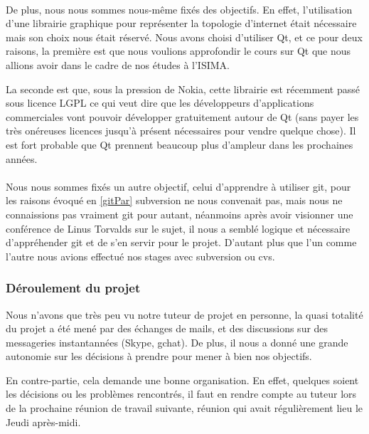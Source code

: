 \paragraph{} De plus, nous nous sommes nous-même fixés des objectifs. En effet, l'utilisation d'une librairie graphique pour représenter la topologie d'internet était nécessaire mais son choix nous était réservé. Nous avons choisi d'utiliser Qt, et ce pour deux raisons, la première est que nous voulions approfondir le cours sur Qt que nous allions avoir dans le cadre de nos études à l'ISIMA.

La seconde est que, sous la pression de Nokia, cette librairie est récemment passé sous licence LGPL ce qui veut dire que les développeurs d'applications commerciales vont pouvoir développer gratuitement autour de Qt (sans payer les très onéreuses licences jusqu'à présent nécessaires pour vendre quelque chose). Il est fort probable que Qt prennent beaucoup plus d'ampleur dans les prochaines années.

\paragraph{} Nous nous sommes fixés un autre objectif, celui d'apprendre à utiliser git, pour les raisons évoqué en \ref{gitPar} subversion ne nous convenait pas, mais nous ne connaissions pas vraiment git pour autant, néanmoins après avoir visionner une conférence de Linus Torvalds sur le sujet, il nous a semblé logique et nécessaire d'appréhender git et de s'en servir pour le projet. D'autant plus que l'un comme l'autre nous avions effectué nos stages avec subversion ou cvs.

\subsubsection{Déroulement du projet}

Nous n'avons que très peu vu notre tuteur de projet en personne, la quasi totalité du projet a été mené par des échanges de mails, et des discussions sur des messageries instantannées (Skype, gchat). De plus, il nous a donné une grande autonomie sur les décisions à prendre pour mener à bien nos objectifs.

En contre-partie, cela demande une bonne organisation. En effet, quelques soient les décisions ou les problèmes rencontrés, il faut en rendre compte au tuteur lors de la prochaine réunion de travail suivante, réunion qui avait régulièrement lieu le Jeudi après-midi.

